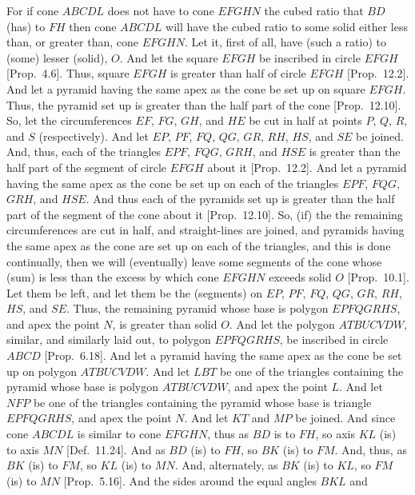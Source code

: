 \begin{Parallel}{}{}
{\epsfysize=1.7in
\centerline{}

For if cone $ABCDL$ does not have to cone $EFGHN$ the cubed ratio that $BD$ (has) to $FH$ then cone $ABCDL$ will  have the
cubed ratio to some solid either less than, or greater than, cone $EFGHN$. Let it, first of all, have (such a  ratio) to
(some) lesser (solid), $O$. And let the square $EFGH$ be inscribed in circle $EFGH$ [Prop.~4.6]. 
Thus, square $EFGH$ is greater than half of circle $EFGH$ [Prop.~12.2]. And let a pyramid having the
same apex as the cone be set up on square $EFGH$. Thus, the pyramid set up is greater than the half part of the cone [Prop.~12.10]. So, let the circumferences $EF$, $FG$, $GH$, and $HE$ be cut in half at points $P$, $Q$, $R$, and $S$ (respectively). 
And let $EP$, $PF$, $FQ$, $QG$, $GR$, $RH$, $HS$, and $SE$ be
joined. And, thus, each of the triangles $EPF$, $FQG$, $GRH$, and $HSE$
is greater than the half part of the segment of circle $EFGH$ about it  [Prop.~12.2]. And let a pyramid having the same apex as
the cone be set up on each of the triangles $EPF$, $FQG$, $GRH$, and $HSE$. And thus each of the pyramids set up is greater than
the half part of the segment of the cone about it [Prop.~12.10]. So, (if) the the remaining circumferences are cut in half, and 
straight-lines are joined, and pyramids having the same apex as the cone are set up on each of 
the triangles, and this is done continually, then we will (eventually) leave some segments of the 
cone whose (sum) is less than the excess by which cone $EFGHN$ exceeds solid $O$ [Prop.~10.1].
Let them be left, and let them be the (segments) on $EP$, $PF$, $FQ$, $QG$, $GR$, $RH$, $HS$, and $SE$. Thus, the remaining
pyramid whose base is polygon $EPFQGRHS$, and apex the point $N$, is greater than solid $O$.  And let the polygon
$ATBUCVDW$, similar, and similarly laid out, to polygon $EPFQGRHS$, be inscribed in circle $ABCD$ [Prop.~6.18].
And let a pyramid having the same apex as the cone be set up on polygon $ATBUCVDW$. And let $LBT$ be one
of the triangles containing the pyramid whose base is polygon $ATBUCVDW$, and apex the point $L$. And let
$NFP$ be one of the triangles containing the pyramid whose base is triangle $EPFQGRHS$, and apex the point
$N$. And let $KT$ and $MP$ be joined. And since cone $ABCDL$ is similar to cone $EFGHN$, thus as
$BD$ is to $FH$, so axis $KL$ (is) to axis $MN$ [Def.~11.24].  And as $BD$ (is) to
$FH$, so $BK$ (is) to $FM$. And, thus, as $BK$ (is) to $FM$, so $KL$ (is) to $MN$. And, alternately, as $BK$ (is)
to $KL$, so $FM$ (is) to $MN$ [Prop.~5.16]. And the sides around the equal angles $BKL$ and
}
\end{Parallel}
